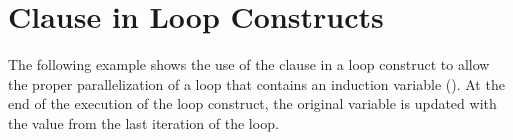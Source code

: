 \section{ Clause in Loop Constructs}
\label{sec:linear_in_loop}

The following example shows the use of the  clause in a loop 
construct to allow the proper parallelization of a loop that contains 
an induction variable ().  At the end of the execution of 
the loop construct, the original variable  is updated with 
the value  from the last iteration of the loop.



